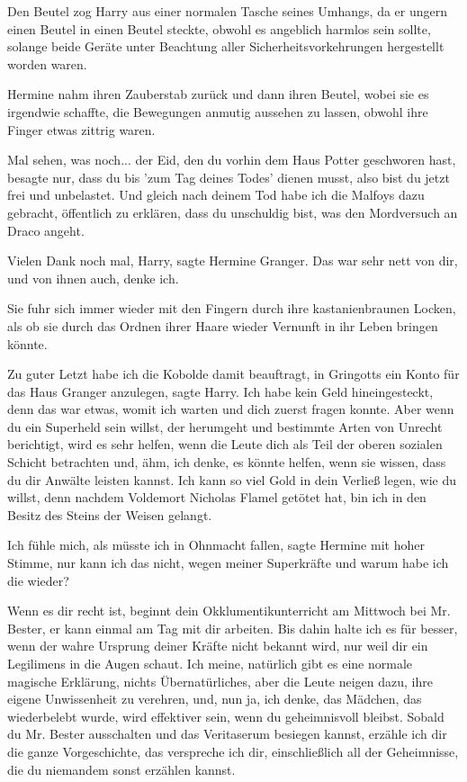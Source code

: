 Den Beutel zog Harry aus einer normalen Tasche seines Umhangs, da er ungern
einen Beutel in einen Beutel steckte, obwohl es angeblich harmlos sein sollte,
solange beide Geräte unter Beachtung aller Sicherheitsvorkehrungen hergestellt
worden waren.

Hermine nahm ihren Zauberstab zurück und dann ihren Beutel, wobei sie es
irgendwie schaffte, die Bewegungen anmutig aussehen zu lassen, obwohl ihre
Finger etwas zittrig waren.

\glqq{}Mal sehen, was noch... der Eid, den du vorhin dem Haus Potter geschworen
hast, besagte nur, dass du bis 'zum Tag deines Todes' dienen musst, also bist du
jetzt frei und unbelastet. Und gleich nach deinem Tod habe ich die Malfoys dazu
gebracht, öffentlich zu erklären, dass du unschuldig bist, was den Mordversuch
an Draco angeht.\grqq{}

\glqq{}Vielen Dank noch mal, Harry\grqq{}, sagte Hermine Granger. \glqq{}Das war
sehr nett von dir, und von ihnen auch, denke ich.\grqq{}

Sie fuhr sich immer wieder mit den Fingern durch ihre kastanienbraunen Locken,
als ob sie durch das Ordnen ihrer Haare wieder Vernunft in ihr Leben bringen
könnte.

\glqq{}Zu guter Letzt habe ich die Kobolde damit beauftragt, in Gringotts ein
Konto für das Haus Granger anzulegen\grqq{}, sagte Harry. \glqq{}Ich habe kein
Geld hineingesteckt, denn das war etwas, womit ich warten und dich zuerst fragen
konnte. Aber wenn du ein Superheld sein willst, der herumgeht und bestimmte
Arten von Unrecht berichtigt, wird es sehr helfen, wenn die Leute dich als Teil
der oberen sozialen Schicht betrachten und, ähm, ich denke, es könnte helfen,
wenn sie wissen, dass du dir Anwälte leisten kannst. Ich kann so viel Gold in
dein Verließ legen, wie du willst, denn nachdem Voldemort Nicholas Flamel
getötet hat, bin ich in den Besitz des Steins der Weisen gelangt.\grqq{}

\glqq{}Ich fühle mich, als müsste ich in Ohnmacht fallen\grqq{}, sagte Hermine
mit hoher Stimme, \glqq{}nur kann ich das nicht, wegen meiner Superkräfte und
warum habe ich die wieder?\grqq{}

\glqq{}Wenn es dir recht ist, beginnt dein Okklumentikunterricht am Mittwoch bei
Mr. Bester, er kann einmal am Tag mit dir arbeiten. Bis dahin halte ich es für
besser, wenn der wahre Ursprung deiner Kräfte nicht bekannt wird, nur weil dir
ein Legilimens in die Augen schaut. Ich meine, natürlich gibt es eine normale
magische Erklärung, nichts Übernatürliches, aber die Leute neigen dazu, ihre
eigene Unwissenheit zu verehren, und, nun ja, ich denke, das Mädchen, das
wiederbelebt wurde, wird effektiver sein, wenn du geheimnisvoll bleibst. Sobald
du Mr. Bester ausschalten und das Veritaserum besiegen kannst, erzähle ich dir
die ganze Vorgeschichte, das verspreche ich dir, einschließlich all der
Geheimnisse, die du niemandem sonst erzählen kannst.\grqq{}

